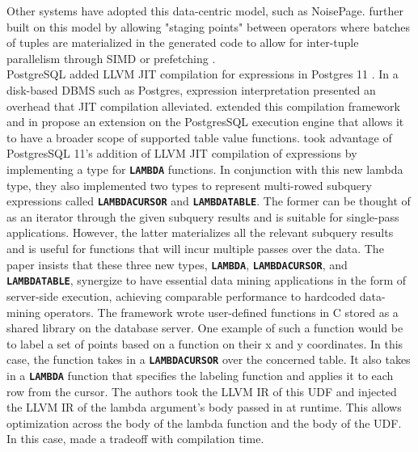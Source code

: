 \documentclass[12pt]{cmuthesis}
\newcommand{\sysname}{NoisePage\xspace}
\newcommand{\dbSQL}[1]{\texttt{\textbf{#1}}\xspace}
\begin{document}
            Other systems have adopted this data-centric model, such as \sysname \cite{pavlo17}. \citeauthor{menon17} further built on this model by allowing "staging points" between operators where batches of tuples are materialized in the generated code to allow for inter-tuple parallelism through SIMD or prefetching \cite{menon17}.\\
    
            PostgreSQL added LLVM JIT compilation for expressions in Postgres 11 \cite{melnik2017jit}. In a disk-based DBMS such as Postgres, expression interpretation presented an overhead that JIT compilation alleviated.  \citeauthor{schule20} extended this compilation framework and in \cite{schule20} propose an extension on the PostgresSQL execution engine that allows it to have a broader scope of supported table value functions. \citeauthor{schule20} took advantage of PostgresSQL 11's addition of LLVM JIT compilation of expressions by implementing a type for \dbSQL{LAMBDA} functions. In conjunction with this new lambda type, they also implemented two types to represent multi-rowed subquery expressions called \dbSQL{LAMBDACURSOR} and \dbSQL{LAMBDATABLE}. The former can be thought of as an iterator through the given subquery results and is suitable for single-pass applications. However, the latter materializes all the relevant subquery results and is useful for functions that will incur multiple passes over the data. The paper insists that these three new types, \dbSQL{LAMBDA}, \dbSQL{LAMBDACURSOR}, and \dbSQL{LAMBDATABLE}, synergize to have essential data mining applications in the form of server-side execution, achieving comparable performance to hardcoded data-mining operators. The framework wrote user-defined functions in C stored as a shared library on the database server. One example of such a function would be to label a set of points based on a function on their x and y coordinates. In this case, the function takes in a \dbSQL{LAMBDACURSOR} over the concerned table. It also takes in a \dbSQL{LAMBDA} function that specifies the labeling function and applies it to each row from the cursor. The authors took the LLVM IR of this UDF and injected the LLVM IR of the lambda argument's body passed in at runtime. This allows optimization across the body of the lambda function and the body of the UDF. In this case, \citeauthor{schule20} made a tradeoff with compilation time.\\
            
\end{document}
